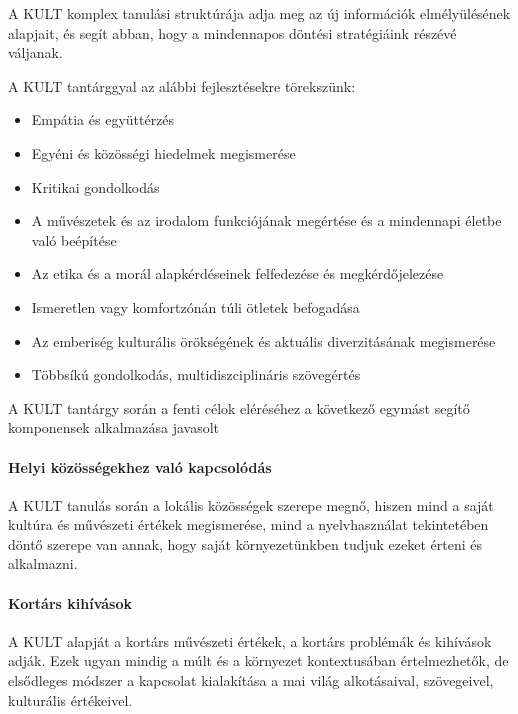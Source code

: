 A KULT komplex tanulási struktúrája adja meg az új információk elmélyülésének alapjait, és segít abban, hogy a mindennapos döntési stratégiáink részévé váljanak.

A KULT tantárggyal az alábbi fejlesztésekre törekszünk:
\begin{itemize}
\item Empátia és együttérzés

\item Egyéni és közösségi hiedelmek megismerése

\item Kritikai gondolkodás

\item A művészetek és az irodalom funkciójának megértése és a mindennapi életbe való beépítése

\item Az etika és a morál alapkérdéseinek felfedezése és megkérdőjelezése

\item Ismeretlen vagy komfortzónán túli ötletek befogadása

\item Az emberiség kulturális örökségének és aktuális diverzitásának megismerése

\item Többsíkú gondolkodás, multidiszciplináris szövegértés
\end{itemize}

A KULT tantárgy során a fenti célok eléréséhez a következő egymást segítő komponensek alkalmazása javasolt

\paragraph{Helyi közösségekhez való kapcsolódás}

A KULT tanulás során a lokális közösségek szerepe megnő, hiszen mind a saját kultúra és művészeti értékek megismerése, mind a nyelvhasználat tekintetében döntő szerepe van annak, hogy saját környezetünkben  tudjuk ezeket érteni és alkalmazni.

\paragraph{Kortárs kihívások}

A KULT alapját a kortárs művészeti értékek, a kortárs problémák és kihívások adják. Ezek ugyan mindig a múlt és a környezet kontextusában értelmezhetők, de elsődleges módszer a kapcsolat kialakítása a mai világ alkotásaival, szövegeivel, kulturális értékeivel.

